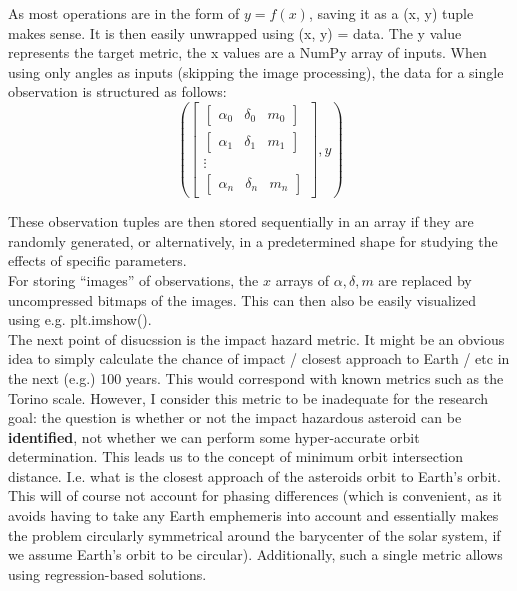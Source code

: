 \documentclass[a4paper,10pt]{article}
\begin{document}
As most operations are in the form of $y = f(x)$, saving it as a (x, y) tuple makes sense. It is then easily unwrapped using (x, y) = data. The y value represents the target metric, the x values are a NumPy array of inputs. When using only angles as inputs (skipping the image processing), the data for a single observation is structured as follows:
\begin{equation}
 \left( \begin{bmatrix}
      \begin{bmatrix}
      \alpha_0 & \delta_0 & m_0
      \end{bmatrix}
      \\
      \begin{bmatrix}
      \alpha_1 & \delta_1 & m_1
      \end{bmatrix}
      \\
      \vdots
      \\
      \begin{bmatrix}
      \alpha_n & \delta_n & m_n
      \end{bmatrix}
     \end{bmatrix}, y\right)
\end{equation}

These observation tuples are then stored sequentially in an array if they are randomly generated, or alternatively, in a predetermined shape for studying the effects of specific parameters. \\

For storing ``images'' of observations, the $x$ arrays of $\alpha, \delta, m$ are replaced by uncompressed bitmaps of the images. This can then also be easily visualized using e.g. plt.imshow(). \\

The next point of disucssion is the impact hazard metric. It might be an obvious idea to simply calculate the chance of impact / closest approach to Earth / etc in the next (e.g.) 100 years. This would correspond with known metrics such as the Torino scale. However, I consider this metric to be inadequate for the research goal: the question is whether or not the impact hazardous asteroid can be \textbf{identified}, not whether we can perform some hyper-accurate orbit determination. This leads us to the concept of minimum orbit intersection distance. I.e. what is the closest approach of the asteroids orbit to Earth's orbit. This will of course not account for phasing differences (which is convenient, as it avoids having to take any Earth emphemeris into account and essentially makes the problem circularly symmetrical around the barycenter of the solar system, if we assume Earth's orbit to be circular). Additionally, such a single metric allows using regression-based solutions. \\
\end{document}
